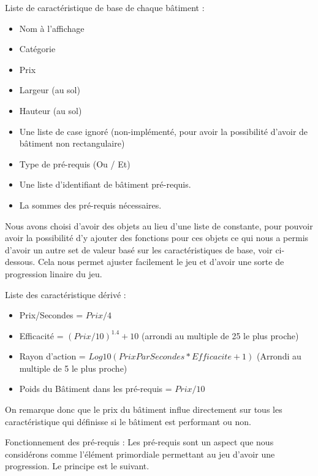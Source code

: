 \documentclass[a4paper,10pt,openany,oneside]{report}
\begin{document}
Liste de caractéristique de base de chaque bâtiment :
\begin{itemize}
	\item Nom à l'affichage
	\item Catégorie
	\item Prix
	\item Largeur (au sol)
	\item Hauteur (au sol)
	\item Une liste de case ignoré (non-implémenté, pour avoir la possibilité d'avoir de bâtiment non rectangulaire)
	\item Type de pré-requis (Ou / Et)
	\item Une liste d'identifiant de bâtiment pré-requis.
	\item La sommes des pré-requis nécessaires. 
\end{itemize}

Nous avons choisi d'avoir des objets au lieu d'une liste de constante, pour pouvoir avoir la possibilité d'y ajouter des fonctions pour ces objets ce qui nous a permis d'avoir un autre set de valeur basé sur les caractéristiques de base, voir ci-dessous. Cela nous permet ajuster facilement le jeu et d'avoir une sorte de progression linaire du jeu.

Liste des caractéristique dérivé :
\begin{itemize}
  \item Prix/Secondes = \(Prix / 4\)
  \item Efficacité = \((Prix/10)^{1.4} + 10\) (arrondi au multiple de 25 le plus proche)
  \item Rayon d'action = \(Log10(PrixParSecondes*Efficacite + 1)\) (Arrondi au multiple de 5 le plus proche)
  \item Poids du Bâtiment dans les pré-requis = \(Prix / 10\)
\end{itemize}

On remarque donc que le prix du bâtiment influe directement sur tous les caractéristique qui définisse si le bâtiment est performant ou non.

Fonctionnement des pré-requis :
Les pré-requis sont un aspect que nous considérons comme l'élément primordiale permettant au jeu d'avoir une progression. Le principe est le suivant.
\end{document}
